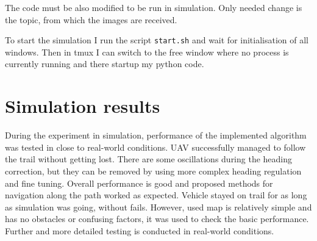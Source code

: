 The code must be also modified to be run in simulation. Only needed change is the topic, from which the images are received.

To start the simulation I run the script \texttt{start.sh} and wait for initialisation of all windows. Then in tmux I can switch to the free window where no process is currently running and there startup my python code. 

\section{Simulation results}

During the experiment in simulation, performance of the implemented algorithm was tested in close to real-world conditions. \acs{UAV} successfully managed to follow the trail without getting lost. There are some oscillations during the heading correction, but they can be removed by using more complex heading regulation and fine tuning. Overall performance is good and proposed methods for navigation along the path worked as expected. Vehicle stayed on trail for as long as simulation was going, without fails. However, used map is relatively simple and has no obstacles or confusing factors, it was used to check the basic performance. Further and more detailed testing is conducted in real-world conditions.



